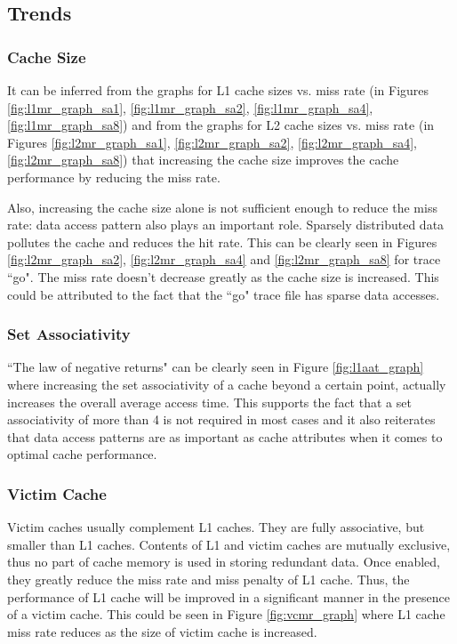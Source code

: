 \documentclass[a4paper]{article}
\begin{document}
\subsection{Trends}
\subsubsection{Cache Size}
It can be inferred from the graphs for L1 cache sizes vs. miss rate (in Figures \ref{fig:l1mr_graph_sa1}, \ref{fig:l1mr_graph_sa2}, \ref{fig:l1mr_graph_sa4}, \ref{fig:l1mr_graph_sa8}) and from the graphs for L2 cache sizes vs. miss rate (in Figures \ref{fig:l2mr_graph_sa1}, \ref{fig:l2mr_graph_sa2}, \ref{fig:l2mr_graph_sa4}, \ref{fig:l2mr_graph_sa8}) that increasing the cache size improves the cache performance by reducing the miss rate. 

Also, increasing the cache size alone is not sufficient enough to reduce the miss rate: data access pattern also plays an important role. Sparsely distributed data pollutes the cache and reduces the hit rate. This can be clearly seen in Figures \ref{fig:l2mr_graph_sa2}, \ref{fig:l2mr_graph_sa4} and \ref{fig:l2mr_graph_sa8} for trace ``go". The miss rate doesn't decrease greatly as the cache size is increased. This could be attributed to the fact that the ``go" trace file has sparse data accesses.

\subsubsection{Set Associativity}
``The law of negative returns" can be clearly seen in Figure \ref{fig:l1aat_graph} where increasing the set associativity of a cache beyond a certain point, actually increases the overall average access time. This supports the fact that a set associativity of more than 4 is not required in most cases and it also reiterates that data access patterns are as important as cache attributes when it comes to optimal cache performance.

\subsubsection{Victim Cache}
Victim caches usually complement L1 caches. They are fully associative, but smaller than L1 caches. Contents of L1 and victim caches are mutually exclusive, thus no part of cache memory is used in storing redundant data. Once enabled, they greatly reduce the miss rate and miss penalty of L1 cache. Thus, the performance of L1 cache will be improved in a significant manner in the presence of a victim cache. This could be seen in Figure \ref{fig:vcmr_graph} where L1 cache miss rate reduces as the size of victim cache is increased. 
\end{document}
